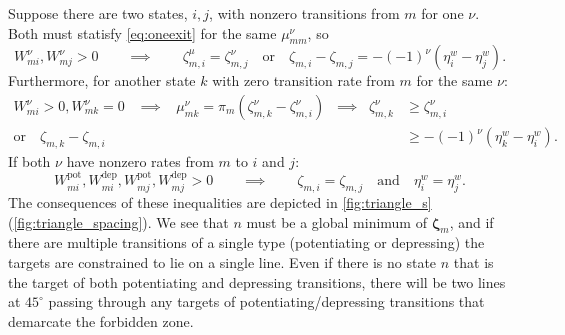 \documentclass[12pt]{article}
\newcommand{\eqm}{\pi}
\newcommand{\etwm}{\eta^w}
\newcommand{\dgnm}{\zeta}
\newcommand{\dgn}{\boldsymbol{\dgnm}}
\newcommand{\Wm}{W}
\newcommand{\pot}{^{\text{pot}}}
\newcommand{\dep}{^{\text{dep}}}
\begin{document}
Suppose there are two states, \(i,j\), with nonzero transitions from \(m\) for one \(\nu\).
Both must statisfy \cref{eq:oneexit} for the same \(\mu^\nu_{mm}\), so
%
\begin{equation}\label{eq:twoexits}
  \Wm^\nu_{mi}, \Wm^\nu_{mj} > 0
  \qquad \implies \qquad
  \dgnm^\mu_{m,i} = \dgnm^\nu_{m,j}
  \quad \text{or}\quad
  \dgnm_{m,i} - \dgnm_{m,j} = - (-1)^\nu (\etwm_i - \etwm_j).
\end{equation}
%
Furthermore, for another state \(k\) with zero transition rate from \(m\) for the same \(\nu\):
%
\begin{equation}\label{eq:nonexit}
\begin{aligned}
  \Wm^\nu_{mi} > 0, \Wm^\nu_{mk} = 0 
  \;\;\; \implies \;\;\;
  \mu^\nu_{mk} = \eqm_m (\dgnm^\nu_{m,k} - \dgnm^\nu_{m,i})
  \;\; \implies \;\;
  \dgnm^\nu_{m,k} &\geq \dgnm^\nu_{m,i} \\
  \text{or}\quad
  \dgnm_{m,k} - \dgnm_{m,i} &\geq - (-1)^\nu (\etwm_k - \etwm_i).
\end{aligned}
\end{equation}
%
If both \(\nu\) have nonzero rates from \(m\) to \(i\) and \(j\):
%
\begin{equation}\label{eq:twodoubleexits}
  \Wm\pot_{mi}, \Wm\dep_{mi}, \Wm\pot_{mj}, \Wm\dep_{mj} > 0
  \qquad \implies \qquad
  \dgnm_{m,i} = \dgnm_{m,j} 
  \quad \text{and} \quad
  \etwm_i = \etwm_j.
\end{equation}
%
The consequences of these inequalities are depicted in \cref{fig:triangle_s}(\ref{fig:triangle_spacing}).
We see that \(n\) must be a global minimum of \(\dgn_m\), and if there are multiple transitions of a single type (potentiating or depressing) the targets are constrained to lie on a single line.
Even if there is no state \(n\) that is the target of both potentiating and depressing transitions, there will be two lines at \(45^\circ \) passing through any targets of potentiating/depressing transitions that demarcate the forbidden zone.
\end{document}
